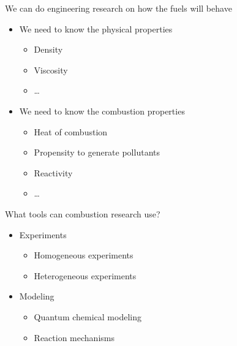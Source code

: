 \documentclass{beamer}
\begin{document}
\begin{frame}{We can do engineering research on how the fuels will behave}
    \begin{itemize}
        \item We need to know the physical properties
        \begin{itemize}
            \item Density
            \item Viscosity
            \item \ldots
        \end{itemize}
        \item We need to know the \alert<2->{combustion properties}
        \begin{itemize}
            \item Heat of combustion
            \item Propensity to generate pollutants
            \item Reactivity
            \item \ldots
        \end{itemize}
    \end{itemize}
\end{frame}

\begin{frame}{What tools can combustion research use?}
    \hspace{6cm} 
    \begin{itemize}
        \item<1-> Experiments 
        \begin{itemize}[<2->]
            \item Homogeneous experiments
            \item Heterogeneous experiments
        \end{itemize}
        \item<1->Modeling
        \begin{itemize}[<3->]
            \item Quantum chemical modeling
            \item Reaction mechanisms
        \end{itemize}
    \end{itemize}
\end{frame}
\end{document}
